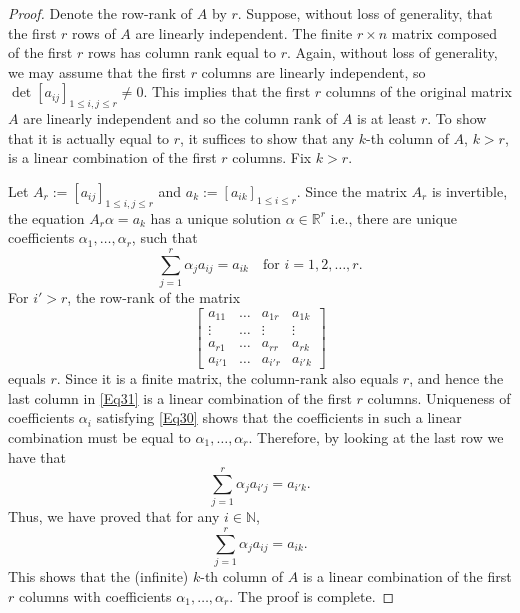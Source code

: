 \documentclass[12pt,leqno]{amsart}
\theoremstyle{definition}
\newcommand{\bbbn}{\mathbb N}
\newcommand{\bbbr}{\mathbb R}
\numberwithin{theorem}{section} \numberwithin{equation}{section}
\begin{document}
\begin{proof}
Denote the row-rank of $A$ by $r$. Suppose, without loss of generality, that the first $r$ rows of $A$ are linearly independent. The finite $r\times n$ matrix composed of the first $r$ rows has column rank equal to $r$. Again, without loss of generality, we may assume that the first $r$ columns are linearly independent, so $\det[a_{ij}]_{1\leq i,j\leq r}\neq 0$.
This implies that the first $r$ columns of the original matrix $A$ are linearly independent and so the column rank of $A$ is at least $r$. To show that it is actually equal to $r$, it suffices to show that any $k$-th column of $A$, $k>r$, is a linear combination of the first $r$ columns. Fix $k>r$.

Let $A_r:=[a_{ij}]_{1\leq i,j\leq r}$ and $a_k:=[a_{ik}]_{1\leq i\leq r}$. Since the matrix $A_r$ is invertible, the equation $A_r\alpha=a_k$ has a unique solution $\alpha\in\bbbr^r$ i.e., there are unique coefficients $\alpha_1,\ldots,\alpha_r$, such that
\begin{equation}
\label{Eq30}
\sum_{j=1}^r \alpha_j a_{ij}=a_{ik}
\quad
\text{for $i=1,2,\ldots,r$.}
\end{equation}
For $i'>r$, the row-rank of the matrix
\begin{equation}
\label{Eq31}
\left[
\begin{array}{cccc}
a_{11} & \ldots & a_{1r} & a_{1k}\\
\vdots & \ldots & \vdots & \vdots \\
a_{r1} & \ldots & a_{rr} & a_{rk}\\
a_{i'1} & \ldots & a_{i'r} & a_{i'k}
\end{array}
\right]
\end{equation}
equals $r$. Since it is a finite matrix, the column-rank also equals $r$, and hence the last column in \eqref{Eq31} is a linear combination of the first $r$ columns. Uniqueness of coefficients $\alpha_i$ satisfying \eqref{Eq30} shows that the coefficients in such a linear combination must be equal to $\alpha_1,\ldots,\alpha_r$. Therefore, by looking at the last row we have that
$$
\sum_{j=1}^r \alpha_j a_{i'j}=a_{i'k}.
$$
Thus, we have proved that for any $i\in\bbbn$,
$$
\sum_{j=1}^r \alpha_j a_{ij}=a_{ik}.
$$
This shows that the (infinite) $k$-th column of $A$ is a linear combination of the first $r$ columns with coefficients $\alpha_1,\ldots,\alpha_r$. The proof is complete.
\end{proof}
\end{document}
